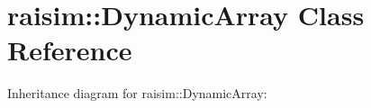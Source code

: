 \hypertarget{classraisim_1_1DynamicArray}{}\section{raisim\+:\+:Dynamic\+Array Class Reference}
\label{classraisim_1_1DynamicArray}


Inheritance diagram for raisim\+:\+:Dynamic\+Array\+:
